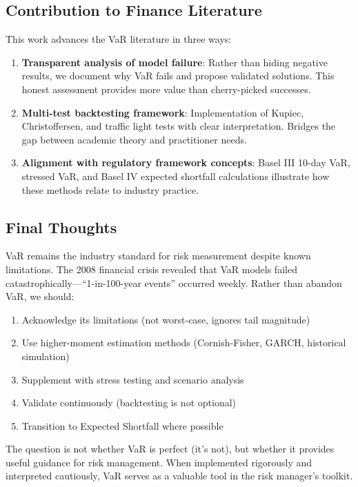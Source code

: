\documentclass[12pt,a4paper]{article}
\begin{document}
\subsection{Contribution to Finance Literature}

This work advances the VaR literature in three ways:

\begin{enumerate}
    \item \textbf{Transparent analysis of model failure}: Rather than hiding negative results, we document why VaR fails and propose validated solutions. This honest assessment provides more value than cherry-picked successes.

    \item \textbf{Multi-test backtesting framework}: Implementation of Kupiec, Christoffersen, and traffic light tests with clear interpretation. Bridges the gap between academic theory and practitioner needs.

    \item \textbf{Alignment with regulatory framework concepts}: Basel III 10-day VaR, stressed VaR, and Basel IV expected shortfall calculations illustrate how these methods relate to industry practice.
\end{enumerate}

\subsection{Final Thoughts}

VaR remains the industry standard for risk measurement despite known limitations. The 2008 financial crisis revealed that VaR models failed catastrophically—``1-in-100-year events'' occurred weekly. Rather than abandon VaR, we should:

\begin{enumerate}
    \item Acknowledge its limitations (not worst-case, ignores tail magnitude)
    \item Use higher-moment estimation methods (Cornish-Fisher, GARCH, historical simulation)
    \item Supplement with stress testing and scenario analysis
    \item Validate continuously (backtesting is not optional)
    \item Transition to Expected Shortfall where possible
\end{enumerate}

The question is not whether VaR is perfect (it's not), but whether it provides useful guidance for risk management. When implemented rigorously and interpreted cautiously, VaR serves as a valuable tool in the risk manager's toolkit.
\end{document}
